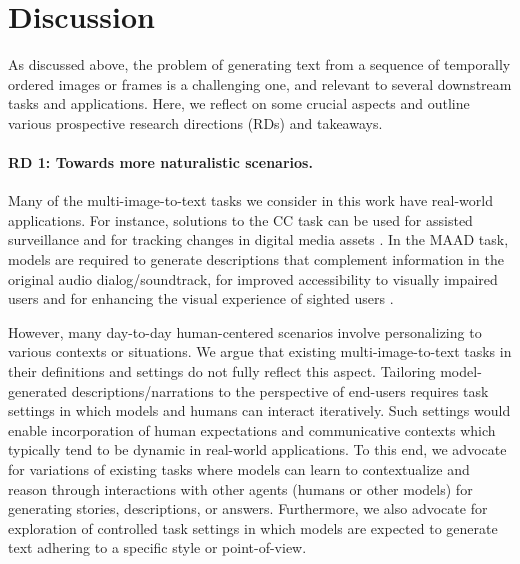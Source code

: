 \section{Discussion}
\label{sec:future_directions}

As discussed above, the problem of generating text from a sequence of temporally ordered images or frames is a challenging one, and relevant to several downstream tasks and applications. Here, we reflect on some crucial aspects and outline various prospective research directions (RDs) and takeaways.

\paragraph{RD 1: Towards more naturalistic scenarios.}
Many of the multi-image-to-text tasks we consider in this work have real-world applications. For instance, solutions to the \color{xkcdVividBlue}CC \color{black} task can be used for assisted surveillance and for tracking changes in digital media assets \cite{cc_spot_the_diff}. In the \color{xkcdVividBlue}MAAD \color{black} task, models are required to generate descriptions that complement information in the original audio dialog/soundtrack, for improved accessibility to visually impaired users and for enhancing the visual experience of sighted users \cite{maad2}.

However, many day-to-day human-centered scenarios involve personalizing to various contexts or situations. We argue that existing multi-image-to-text tasks in their definitions and settings do not fully reflect this aspect. Tailoring model-generated descriptions/narrations to the perspective of end-users requires task settings in which models and humans can interact iteratively. Such settings would enable incorporation of human expectations and communicative contexts which typically tend to be dynamic in real-world applications. To this end, we advocate for variations of existing tasks where models can learn to contextualize and reason through interactions with other agents (humans or other models) for generating stories, descriptions, or answers. Furthermore, we also advocate for exploration of controlled task settings in which models are expected to generate text adhering to a specific style \cite{rd_task1} or point-of-view.

